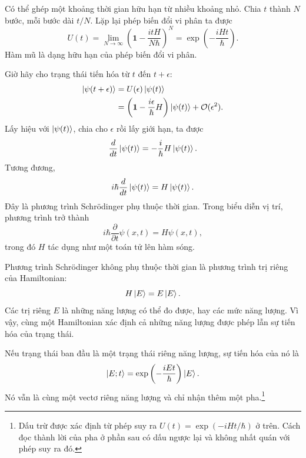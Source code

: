 Có thể ghép một khoảng thời gian hữu hạn từ nhiều khoảng nhỏ. Chia \(t\) thành \(N\) bước, mỗi bước dài \(t/N\). Lặp lại phép biến đổi vi phân ta được
\begin{equation}
U(t)
=
\lim_{N\to\infty}
\left(
\mathbf 1-\frac{itH}{N\hbar}
\right)^N
=
\exp\left(-\frac{iHt}{\hbar}\right).
\end{equation}
Hàm mũ là dạng hữu hạn của phép biến đổi vi phân.

Giờ hãy cho trạng thái tiến hóa từ \(t\) đến \(t+\epsilon\):
\begin{align}
\left\lvert\psi(t+\epsilon)\right\rangle
&=
U(\epsilon)\left\lvert\psi(t)\right\rangle
\\
&=
\left(
\mathbf 1-\frac{i\epsilon}{\hbar}H
\right)\left\lvert\psi(t)\right\rangle
+\mathcal O(\epsilon^2).
\end{align}
Lấy hiệu với \(\left\lvert\psi(t)\right\rangle\), chia cho \(\epsilon\) rồi lấy giới hạn, ta được
\begin{equation}
\frac{d}{dt}\left\lvert\psi(t)\right\rangle
=
-\frac{i}{\hbar}H\left\lvert\psi(t)\right\rangle.
\end{equation}
Tương đương,
\begin{equation}
i\hbar\frac{d}{dt}\left\lvert\psi(t)\right\rangle
=
H\left\lvert\psi(t)\right\rangle.
\end{equation}
Đây là phương trình Schr\"odinger phụ thuộc thời gian. Trong biểu diễn vị trí, phương trình trở thành
\begin{equation}
i\hbar\frac{\partial}{\partial t}\psi(x,t)
=
H\psi(x,t),
\end{equation}
trong đó \(H\) tác dụng như một toán tử lên hàm sóng.

Phương trình Schr\"odinger không phụ thuộc thời gian là phương trình trị riêng của Hamiltonian:
\begin{equation}
H\left\lvert E\right\rangle=E\left\lvert E\right\rangle.
\end{equation}
Các trị riêng \(E\) là những năng lượng có thể đo được, hay các mức năng lượng. Vì vậy, cùng một Hamiltonian xác định cả những năng lượng được phép lẫn sự tiến hóa của trạng thái.

Nếu trạng thái ban đầu là một trạng thái riêng năng lượng, sự tiến hóa của nó là
\begin{equation}
\left\lvert E;t\right\rangle
=
\exp\left(-\frac{iEt}{\hbar}\right)\left\lvert E\right\rangle.
\end{equation}
Nó vẫn là cùng một vectơ riêng năng lượng và chỉ nhận thêm một pha.\footnote{Dấu trừ được xác định từ phép suy ra \(U(t)=\exp(-iHt/\hbar)\) ở trên. Cách đọc thành lời của pha ở phần sau có dấu ngược lại và không nhất quán với phép suy ra đó.}

\begin{classroomqa}
\end{classroomqa}

